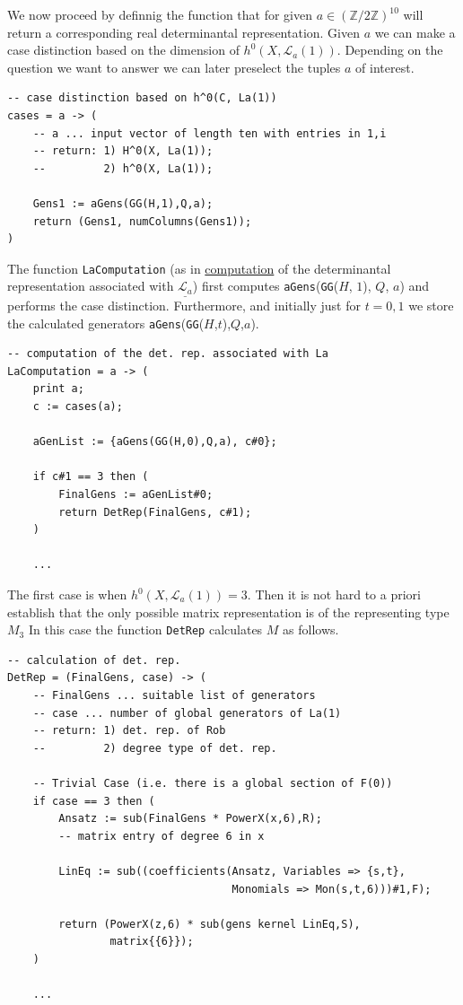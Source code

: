 \documentclass[a4paper,10pt]{amsart}
\theoremstyle{definition}
\theoremstyle{plain}
\newcommand{\cL}{{\mathcal L}}
\newcommand{\Z}{{\mathbb Z}}
\begin{document}
We now proceed by definnig the function that for given $a \in (\Z/2\Z)^{10}$ will return a corresponding real determinantal representation. Given $a$ we can make a case distinction based on the dimension of $h^0(X, \cL_a(1))$. Depending on the question we want to answer we can later preselect the tuples $a$ of interest.

\begin{oframed}
\begin{verbatim}
-- case distinction based on h^0(C, La(1))
cases = a -> (
    -- a ... input vector of length ten with entries in 1,i
    -- return: 1) H^0(X, La(1));
    --         2) h^0(X, La(1));
    
    Gens1 := aGens(GG(H,1),Q,a);
    return (Gens1, numColumns(Gens1));
)
\end{verbatim}
\end{oframed}

The function \texttt{LaComputation} (as in \underline{computation} of the determinantal representation associated with $\underline{\cL_a}$) first computes \texttt{aGens}(\texttt{GG}($H$, $1$), $Q$, $a$) and performs the case distinction. Furthermore, and initially just for $t = 0, 1$ we store the calculated generators \texttt{aGens}(\texttt{GG}($H$,$t$),$Q$,$a$).

\begin{oframed}
\begin{verbatim}
-- computation of the det. rep. associated with La
LaComputation = a -> (
    print a;
    c := cases(a);

    aGenList := {aGens(GG(H,0),Q,a), c#0};

    if c#1 == 3 then (
        FinalGens := aGenList#0;
        return DetRep(FinalGens, c#1);
    )

    ...
\end{verbatim}
\end{oframed}

The first case is when $h^0(X, \cL_a(1)) = 3$. Then it is not hard to a priori establish that the only possible matrix representation is of the representing type $M_3$ In this case the function \texttt{DetRep} calculates $M$ as follows.

\begin{oframed}
\begin{verbatim}
-- calculation of det. rep.
DetRep = (FinalGens, case) -> (
    -- FinalGens ... suitable list of generators
    -- case ... number of global generators of La(1) 
    -- return: 1) det. rep. of Rob
    --         2) degree type of det. rep.

    -- Trivial Case (i.e. there is a global section of F(0))
    if case == 3 then (
        Ansatz := sub(FinalGens * PowerX(x,6),R);
        -- matrix entry of degree 6 in x
        
        LinEq := sub((coefficients(Ansatz, Variables => {s,t},
                                   Monomials => Mon(s,t,6)))#1,F);
        
        return (PowerX(z,6) * sub(gens kernel LinEq,S),
                matrix{{6}});
    )

    ...
\end{verbatim}
\end{oframed}
\end{document}
